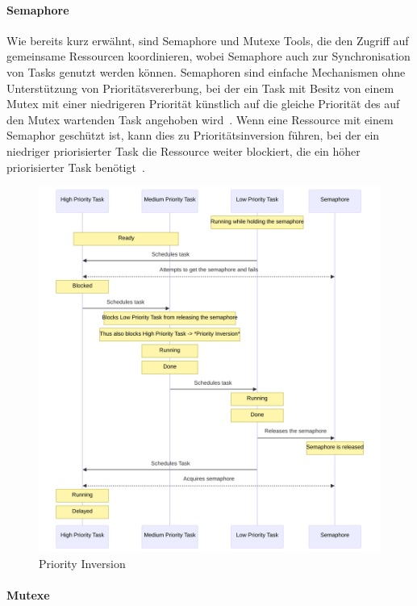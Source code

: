 \paragraph{Semaphore}

Wie bereits kurz erwähnt, sind Semaphore und Mutexe Tools, die den Zugriff auf
gemeinsame Ressourcen koordinieren, wobei Semaphore auch zur Synchronisation von
Tasks genutzt werden können. Semaphoren sind einfache Mechanismen ohne
Unterstützung von Prioritätsvererbung, bei der ein Task mit Besitz von einem
Mutex mit einer niedrigeren Priorität künstlich auf die gleiche Priorität des
auf den Mutex wartenden Task angehoben
wird~\cite{wikipedia_priority_inheritance}. Wenn eine Ressource mit einem
Semaphor geschützt ist, kann dies zu Prioritätsinversion führen, bei der ein
niedriger priorisierter Task die Ressource weiter blockiert, die ein höher
priorisierter Task benötigt~\cite{wikipedia_priority_inversion}.

\begin{figure}[htb]
    \centering
    \includegraphics[width=1\textwidth]{assets/prio_inversion}
    \caption{Priority Inversion}
\end{figure}

\paragraph{Mutexe}

